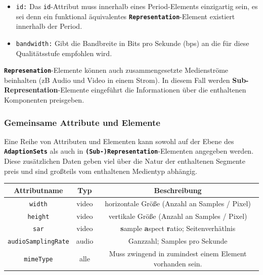 \documentclass[paper = a4, fontsize = 12pt, parskip = half]{scrartcl} %
\def\attr#1{\texttt{#1}}
\def\elem#1{\texttt{\textbf{#1}}}
\begin{document}
\begin{itemize}
	\item \attr{id:} Das \attr{id}-Attribut muss innerhalb eines Period-Elements einzigartig sein, es sei denn ein funktional äquivalentes \elem{Representation}-Element existiert innerhalb der Period.
	\item \attr{bandwidth:} Gibt die Bandbreite in Bits pro Sekunde (bps) an die für diese Qualitätsstufe empfohlen wird.
\end{itemize}

\elem{Represenation}-Elemente können auch zusammengesetzte Medienströme beinhalten (zB Audio und Video in einem Strom). In diesem Fall werden \textbf{Sub-Representation}-Elemente eingeführt die Informationen über die enthaltenen Komponenten preisgeben.

\subsubsection{Gemeinsame Attribute und Elemente}
Eine Reihe von Attributen und Elementen kann sowohl auf der Ebene des \elem{AdaptionSets} als auch in \elem{(Sub-)Representation}-Elementen angegeben werden. Diese zusätzlichen Daten geben viel über die Natur der enthaltenen Segmente preis und sind großteils vom enthaltenen Medientyp abhängig.

\begin{center}
	\begin{tabular}{| c | c | c |}
		\hline
		\textbf{Attributname} & \textbf{Typ} & \textbf{Beschreibung}                                            \\
		\hline
		\hline
		\attr{width}                 & video        & horizontale Größe (Anzahl an Samples / Pixel)                    \\
		\hline
		\attr{height}                & video        & vertikale Größe (Anzahl an Samples / Pixel)                      \\
		\hline
		\attr{sar}                   & video        & \textbf{s}ample \textbf{a}spect \textbf{r}atio; Seitenverhätlnis \\
		\hline
		\attr{audioSamplingRate}     & audio        & Ganzzahl; Samples pro Sekunde                                    \\
		\hline
		\attr{mimeType}              & alle         & Muss zwingend in zumindest einem Element vorhanden sein.         \\
		\hline
	\end{tabular}
\end{center}
\end{document}
